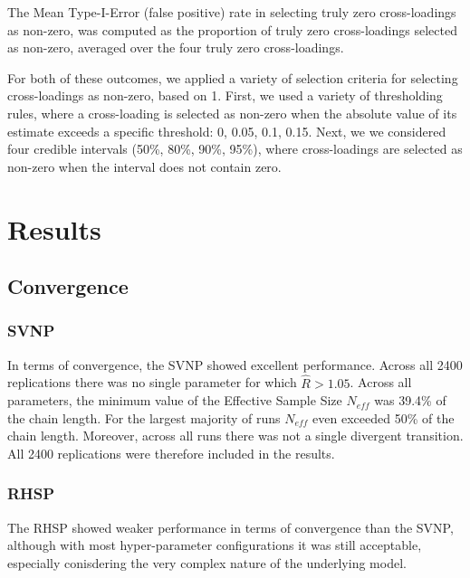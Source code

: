 \documentclass[
  man, donotrepeattitle,floatsintext]{apa6}
\begin{document}
The Mean Type-I-Error (false positive) rate in selecting truly zero cross-loadings as non-zero, was computed as the proportion of truly zero cross-loadings selected as non-zero, averaged over the four truly zero cross-loadings.

For both of these outcomes, we applied a variety of selection criteria for selecting cross-loadings as non-zero, based on 1. First, we used a variety of thresholding rules, where a cross-loading is selected as non-zero when the absolute value of its estimate exceeds a specific threshold: 0, 0.05, 0.1, 0.15. Next, we we considered four credible intervals (50\%, 80\%, 90\%, 95\%), where cross-loadings are selected as non-zero when the interval does not contain zero.

\hypertarget{results}{%
\section{Results}\label{results}}

\hypertarget{convergence}{%
\subsection{Convergence}\label{convergence}}

\hypertarget{svnp}{%
\subsubsection{SVNP}\label{svnp}}

In terms of convergence, the SVNP showed excellent performance. Across all 2400 replications there was no single parameter for which \(\hat{R} > 1.05\). Across all parameters, the minimum value of the Effective Sample Size \(N_{eff}\) was 39.4\% of the chain length. For the largest majority of runs \(N_{eff}\) even exceeded 50\% of the chain length. Moreover, across all runs there was not a single divergent transition. All 2400 replications were therefore included in the results.

\hypertarget{rhsp}{%
\subsubsection{RHSP}\label{rhsp}}

The RHSP showed weaker performance in terms of convergence than the SVNP, although with most hyper-parameter configurations it was still acceptable, especially conisdering the very complex nature of the underlying model.
\end{document}
